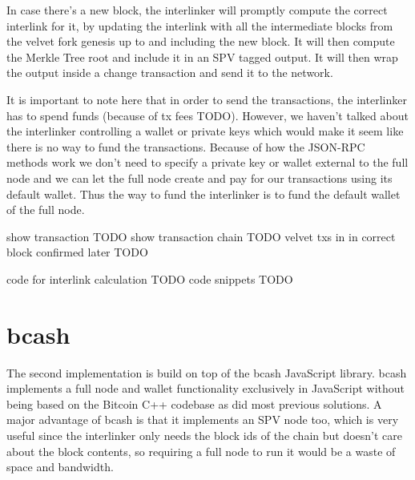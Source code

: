 In case there's a new block, the interlinker will promptly compute the correct interlink for it, by updating the interlink with all the intermediate blocks from the velvet fork genesis up to and including the new block. It will then compute the Merkle Tree root and include it in an SPV tagged output. It will then wrap the output inside a change transaction and send it to the network.

It is important to note here that in order to send the transactions, the interlinker has to spend funds (because of tx fees TODO). However, we haven't talked about the interlinker controlling a wallet or private keys which would make it seem like there is no way to fund the transactions. Because of how the JSON-RPC methods work we don't need to specify a private key or wallet external to the full node and we can let the full node create and pay for our transactions using its default wallet. Thus the way to fund the interlinker is to fund the default wallet of the full node.

show transaction TODO
show transaction chain TODO
velvet txs in in correct block confirmed later TODO

code for interlink calculation TODO
code snippets TODO

\section{bcash}
The second implementation is build on top of the bcash JavaScript library. bcash implements a full node and wallet functionality exclusively in JavaScript without being based on the Bitcoin C++ codebase as did most previous solutions. A major advantage of bcash is that it implements an SPV node too, which is very useful since the interlinker only needs the block ids of the chain but doesn't care about the block contents, so requiring a full node to run it would be a waste of space and bandwidth.
